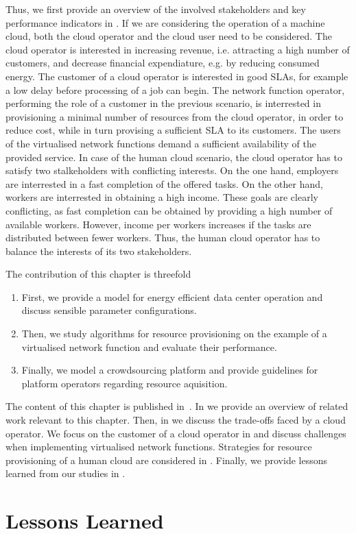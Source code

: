 Thus, we first provide an overview of the involved stakeholders and key performance indicators in .
If we are considering the operation of a machine cloud, both the cloud operator and the cloud user need to be considered.
The cloud operator is interested in increasing revenue, i.e. attracting a high number of customers, and decrease financial expendiature, e.g. by reducing consumed energy.
The customer of a cloud operator is interested in good \glspl{SLA}, for example a low delay before processing of a job can begin.
The network function operator, performing the role of a customer in the previous scenario, is interrested in provisioning a minimal number of resources from the cloud operator, in order to reduce cost, while in turn provising a sufficient \gls{SLA} to its customers.
The users of the virtualised network functions demand a sufficient availability of the provided service.
In case of the human cloud scenario, the cloud operator has to satisfy two stalkeholders with conflicting interests.
On the one hand, employers are interrested in a fast completion of the offered tasks.
On the other hand, workers are interrested in obtaining a high income.
These goals are clearly conflicting, as fast completion can be obtained by providing a high number of available workers.
However, income per workers increases if the tasks are distributed between fewer workers.
Thus, the human cloud operator has to balance the interests of its two stakeholders.

The contribution of this chapter is threefold
\begin{enumerate}
\item First, we provide a model for energy efficient data center operation and discuss sensible parameter configurations. 
\item Then, we study algorithms for resource provisioning on the example of a virtualised network function and evaluate their performance.
\item Finally, we model a crowdsourcing platform and provide guidelines for platform operators regarding resource aquisition.
\end{enumerate}

The content of this chapter is published in~\cite{Schwartz2012a,Metzger2014a,Schwartz2015}.
In  we provide an overview of related work relevant to this chapter.
Then, in  we discuss the trade-offs faced by a cloud operator.
We focus on the customer of a cloud operator in  and discuss challenges when implementing virtualised network functions.
Strategies for resource provisioning of a human cloud are considered in .
Finally, we provide lessons learned from our studies in .






\section{Lessons Learned}